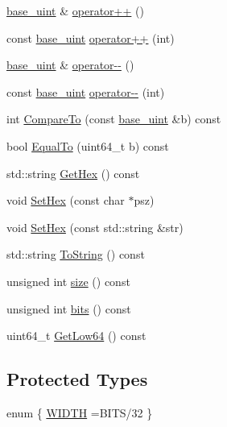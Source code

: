 \begin{DoxyCompactItemize}
\item 
\hyperlink{classbase__uint}{base\+\_\+uint} \& \hyperlink{classbase__uint_a56b54869886808961092d3f764fadd9f}{operator++} ()
\item 
const \hyperlink{classbase__uint}{base\+\_\+uint} \hyperlink{classbase__uint_a2d5a123c856b2b31fae5f65891832486}{operator++} (int)
\item 
\hyperlink{classbase__uint}{base\+\_\+uint} \& \hyperlink{classbase__uint_a2cc581d32afac619acd12601ddea4180}{operator-\/-\/} ()
\item 
const \hyperlink{classbase__uint}{base\+\_\+uint} \hyperlink{classbase__uint_a78a8e46c434c0e61be86282fe9543587}{operator-\/-\/} (int)
\item 
int \hyperlink{classbase__uint_ac9777c80cfcf1355cf17258027ca35bb}{Compare\+To} (const \hyperlink{classbase__uint}{base\+\_\+uint} \&b) const 
\item 
bool \hyperlink{classbase__uint_a39817436d7ba143e8d52abc475097384}{Equal\+To} (uint64\+\_\+t b) const 
\item 
std\+::string \hyperlink{classbase__uint_ac9929c28600796a9acf75881bb750576}{Get\+Hex} () const 
\item 
void \hyperlink{classbase__uint_ade1a897fac931f28f54998c92c797228}{Set\+Hex} (const char $\ast$psz)
\item 
void \hyperlink{classbase__uint_afe3600e6ae4e9f69e1c036581a2716c8}{Set\+Hex} (const std\+::string \&str)
\item 
std\+::string \hyperlink{classbase__uint_ac3080a72402cadf28dbc9f9b69cc60be}{To\+String} () const 
\item 
unsigned int \hyperlink{classbase__uint_ae0e221686cd63384569a8db5cc06d4c9}{size} () const 
\item 
unsigned int \hyperlink{classbase__uint_a4867652ab4163a10ac4e3d04f0352423}{bits} () const 
\item 
uint64\+\_\+t \hyperlink{classbase__uint_abf39b71afc016b333b8996def4c6bc40}{Get\+Low64} () const 
\end{DoxyCompactItemize}
\subsection*{Protected Types}
\begin{DoxyCompactItemize}
\item 
enum \{ \hyperlink{classbase__uint_afee51629f03ba95d823ab4ee94cf6c81adf579395d753e2d9607ecd61424f0853}{W\+I\+D\+T\+H} =B\+I\+T\+S/32
 \}
\end{DoxyCompactItemize}
